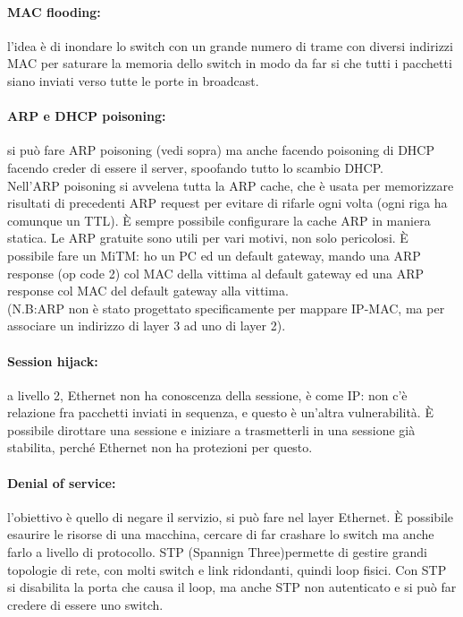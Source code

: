 \documentclass[12pt, oneside]{extbook} %
\begin{document}
\paragraph{MAC flooding:}l'idea è di inondare lo switch con un grande numero di trame con diversi indirizzi MAC per saturare la memoria dello switch in modo da far si che tutti i pacchetti siano inviati verso tutte le porte in broadcast.\\
\paragraph{ARP e DHCP poisoning:}si può fare ARP poisoning (vedi sopra) ma anche facendo poisoning di DHCP facendo creder di essere il server, spoofando tutto lo scambio DHCP.\\ Nell'ARP poisoning si avvelena tutta la ARP cache, che è usata per memorizzare risultati di precedenti ARP request per evitare di rifarle ogni volta (ogni riga ha comunque un TTL). È sempre possibile configurare la cache ARP in maniera statica. Le ARP gratuite sono utili per vari motivi, non solo pericolosi. È possibile fare un MiTM: ho un PC ed un default gateway, mando una ARP response (op code 2) col MAC della vittima al default gateway ed una ARP response col MAC del default gateway alla vittima.\\ (N.B:ARP non è stato progettato specificamente per mappare IP-MAC, ma per associare un indirizzo di layer 3 ad uno di layer 2).
\paragraph{Session hijack: }a livello 2, Ethernet non ha conoscenza della sessione, è come IP: non c'è relazione fra pacchetti inviati in sequenza, e questo è un'altra vulnerabilità. È possibile dirottare una sessione e iniziare a trasmetterli in una sessione già stabilita, perché Ethernet non ha protezioni per questo.
\paragraph{Denial of service:}l'obiettivo è quello di negare il servizio, si può fare nel layer Ethernet. È possibile esaurire le risorse di una macchina, cercare di far crashare lo switch ma anche farlo a livello di protocollo. STP (Spannign Three)permette di gestire grandi topologie di rete, con molti switch e link ridondanti, quindi loop fisici. Con STP si disabilita la porta che causa il loop, ma anche STP non  autenticato e si può far credere di essere uno switch.
\end{document}
